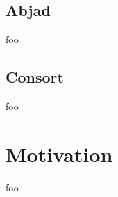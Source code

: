 \begin{singlespacing}
\vspace{-0.5\baselineskip}
\begin{multicols}{2}

\vfill
\columnbreak
\setlength\fboxsep{0pt}
\setlength\fboxrule{0.5pt}
\noindent{}
\end{multicols}
\end{singlespacing}

\subsection{Abjad}

foo

\subsection{Consort}

foo

\section{Motivation}

foo
